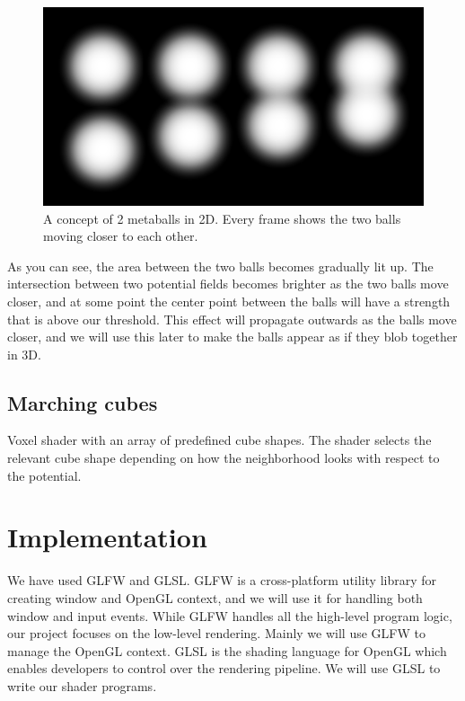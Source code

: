 \documentclass{article}
\begin{document}
\begin{multicols}{2}
        	\begin{figure}[H]
        		\centering
            	\begin{minipage}[b]{0.4\textwidth}
            		\includegraphics[width=\textwidth]{img/2d-potential-multi.png}
            		\caption{A concept of 2 metaballs in 2D. Every frame shows the two balls moving closer to each other.}
            		\label{fig:2d-potential-multi}
            	\end{minipage}
            \end{figure}

            As you can see, the area between the two balls becomes gradually lit up.
            The intersection between two potential fields becomes brighter as the two balls move closer, and at some point the center point between the balls will have a strength that is above our threshold. This effect will propagate outwards as the balls move closer, and we will use this later to make the balls appear as if they blob together in 3D.

        \subsection{Marching cubes}
            Voxel shader with an array of predefined cube shapes. The shader selects the relevant cube shape depending on how the neighborhood looks with respect to the potential.

    \section{Implementation}

        We have used GLFW and GLSL. GLFW is a cross-platform utility library for creating window and OpenGL context, and we will use it for handling both window and input events. While GLFW handles all the high-level program logic, our project focuses on the low-level rendering. Mainly we will use GLFW to manage the OpenGL context. GLSL is the shading language for OpenGL which enables developers to control over the rendering pipeline. We will use GLSL to write our shader programs.
        

\end{multicols}
\end{document}
